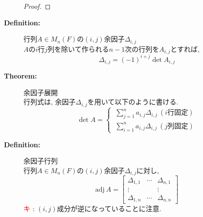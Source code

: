 \documentclass[dvipdfmx]{jsarticle}
\newcommand*{\point}{\textcircled{\textcolor{red}{\scriptsize キ}} }
\begin{document}
\begin{description}
\begin{proof}
            \end{proof}

        \item[\bf{Definition:}] 行列$A \in M_n(F)$の$(i,j)$余因子$\Delta_{i,j}$ \\
            $A$の$i$行$j$列を除いて作られる$n-1$次の行列を$A_{i,j}$とすれば, 
            $$ \Delta_{i,j} = (-1)^{i+j} \det A_{i,j} $$

        \item[\bf{Theorem:}]  余因子展開 \\
            行列式は, 余因子$\Delta_{i,j}$を用いて以下のように書ける.
            $$ \det A = \begin{cases} \ \displaystyle \sum_{j=1}^n a_{i,j} \Delta_{i,j} \ (i\text{行固定}) \\ \ \displaystyle \sum_{i=1}^n a_{i,j} \Delta_{i,j} \ (j\text{列固定}) \end{cases}$$

        \item[\bf{Definition:}] 余因子行列 \\
            行列$A \in M_n(F)$の$(i,j)$余因子$\Delta_{i,j}$に対し, 
            $$ \mathrm{adj} \ A = \begin{bmatrix}
                \Delta_{1,1} & \cdots & \Delta_{n,1} \\
                \vdots & & \vdots \\
                \Delta_{1,n} & \cdots & \Delta_{n,n}
            \end{bmatrix}
            $$
            \point : $(i,j)$成分が逆になっていることに注意.


\end{description}
\end{document}
